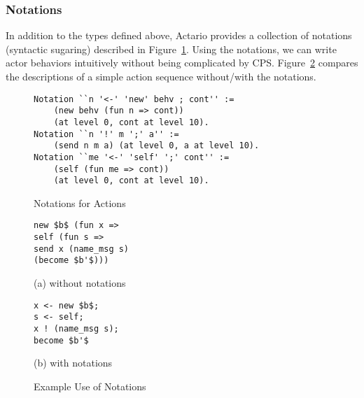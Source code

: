 \subsubsection{Notations}

In addition to the types defined above, Actario provides a collection
of notations (syntactic sugaring) described in
Figure~\ref{coq:notation}.  Using the notations, we can write actor
behaviors intuitively without being complicated by CPS.
Figure~\ref{fig:notationexample} compares the descriptions of a simple
action sequence without/with the notations.

\begin{figure}
\begin{lstlisting}
Notation ``n '<-' 'new' behv ; cont'' :=
    (new behv (fun n => cont))
    (at level 0, cont at level 10).
Notation ``n '!' m ';' a'' :=
    (send n m a) (at level 0, a at level 10).
Notation ``me '<-' 'self' ';' cont'' :=
    (self (fun me => cont))
    (at level 0, cont at level 10).
\end{lstlisting}
\caption{Notations for Actions}\label{coq:notation}
\end{figure}

\begin{figure}\centering
\begin{minipage}{0.2\textwidth}\centering
\begin{lstlisting}[frame=single]
new $b$ (fun x =>
self (fun s =>
send x (name_msg s)
(become $b'$)))
\end{lstlisting}
(a) without notations
\end{minipage}
\hspace*{3ex}
\begin{minipage}{0.2\textwidth}\centering
\begin{lstlisting}[frame=single]
x <- new $b$;
s <- self;
x ! (name_msg s);
become $b'$
\end{lstlisting}
(b) with notations
\end{minipage}
\caption{Example Use of Notations}\label{fig:notationexample}
\end{figure}
